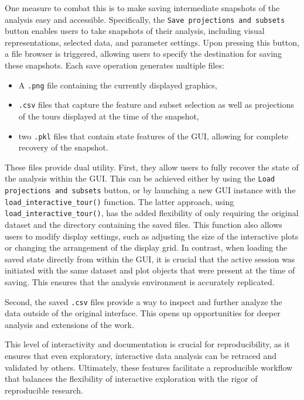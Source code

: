 \documentclass[article]{ajs}
\begin{document}
One measure to combat this is to make saving intermediate snapshots of the analysis easy and accessible. Specifically, the \texttt{Save projections and subsets} button enables users to take snapshots of their analysis, including visual representations, selected data, and parameter settings. Upon pressing this button, a file browser is triggered, allowing users to specify the destination for saving these snapshots. Each save operation generates multiple files:


\begin{itemize}
    \item A \texttt{.png} file containing the currently displayed graphics,
    \item \texttt{.csv} files that capture the feature and subset selection as well as projections of the tours displayed at the time of the snapshot,
    \item two \texttt{.pkl} files that contain state features of the GUI, allowing for complete recovery of the snapshot.
\end{itemize}

These files provide dual utility. First, they allow users to fully recover the state of the analysis within the GUI. This can be achieved either by using the \texttt{Load projections and subsets} button, or by launching a new GUI instance with the \texttt{load\_interactive\_tour()} function. The latter approach, using \texttt{load\_interactive\_tour()}, has the added flexibility of only requiring the original dataset and the directory containing the saved files. This function also allows users to modify display settings, such as adjusting the size of the interactive plots or changing the arrangement of the display grid. In contrast, when loading the saved state directly from within the GUI, it is crucial that the active session was initiated with the same dataset and plot objects that were present at the time of saving. This ensures that the analysis environment is accurately replicated.

Second, the saved \texttt{.csv} files provide a way to inspect and further analyze the data outside of the original interface. This opens up opportunities for deeper analysis and extensions of the work.

This level of interactivity and documentation is crucial for reproducibility, as it ensures that even exploratory, interactive data analysis can be retraced and validated by others. Ultimately, these features facilitate a reproducible workflow that balances the flexibility of interactive exploration with the rigor of reproducible research.
\end{document}
